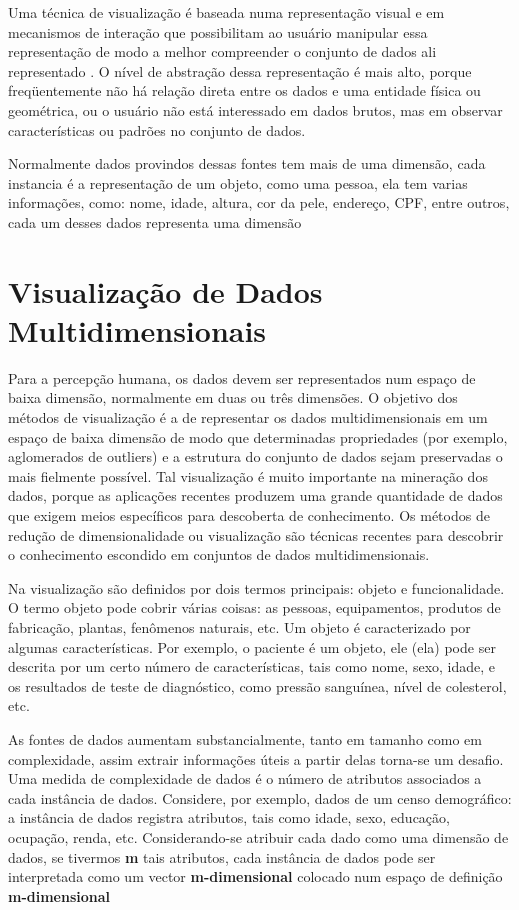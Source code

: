 Uma técnica de visualização é baseada numa representação visual e em mecanismos de interação que possibilitam ao usuário manipular essa representação de modo a melhor compreender o conjunto de dados ali representado \cite{freitas2001introduccao}. O nível de abstração dessa representação é mais alto, porque freqüentemente não há relação direta entre os dados e uma entidade física ou geométrica, ou o usuário não está interessado em dados brutos, mas em observar características ou padrões no conjunto de dados. 

Normalmente dados provindos dessas fontes tem mais de uma dimensão, cada instancia é a representação de um objeto, como uma pessoa, ela tem varias informações, como: nome, idade, altura, cor da pele, endereço, CPF, entre outros,  cada um desses dados representa uma dimensão 

\section{Visualização de Dados Multidimensionais}
\label{VisMultidimensionais-sec}

Para a percepção humana, os dados devem ser representados num espaço de baixa dimensão, normalmente em duas ou três dimensões. O objetivo dos métodos de visualização é a de representar os dados multidimensionais em um espaço de baixa dimensão de modo que determinadas propriedades (por exemplo, aglomerados de outliers) e a estrutura do conjunto de dados sejam preservadas o mais fielmente possível. Tal visualização é muito importante na mineração dos dados, porque as aplicações recentes produzem uma grande quantidade de dados que exigem meios específicos para descoberta de conhecimento.
Os métodos de redução de dimensionalidade ou visualização são técnicas recentes para descobrir o conhecimento escondido em conjuntos de dados multidimensionais. \cite{dzemyda2013multidimensional}

Na visualização são definidos por dois termos principais: objeto e funcionalidade. O termo objeto pode cobrir várias coisas: as pessoas, equipamentos, produtos de fabricação, plantas, fenômenos naturais, etc. Um objeto é caracterizado por algumas características. Por exemplo, o paciente é um objeto, ele (ela) pode ser descrita por um certo número de características, tais como nome, sexo, idade, e os resultados de teste de diagnóstico, como pressão sanguínea, nível de colesterol, etc. \cite{dzemyda2013multidimensional}


As fontes de dados aumentam substancialmente, tanto em tamanho como em complexidade, assim extrair informações úteis a partir delas torna-se um desafio. Uma medida de complexidade de dados é o número de atributos associados a cada instância de dados. Considere, por exemplo, dados de um censo demográfico: a instância de dados registra atributos, tais como idade, sexo, educação, ocupação, renda, etc. Considerando-se atribuir cada dado como uma dimensão de dados, se tivermos \textbf{m} tais atributos, cada instância de dados pode ser interpretada como um vector \textbf{m-dimensional} colocado num espaço de definição \textbf{m-dimensional}\cite{paulovich2008least}

